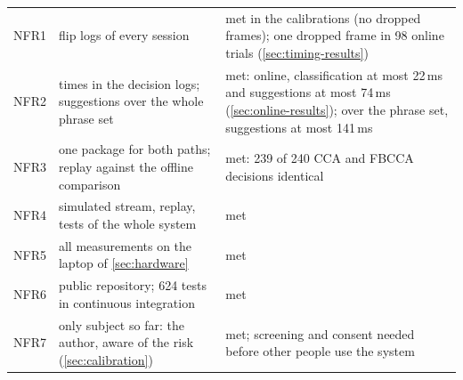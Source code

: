 \begin{table}[tb]
\begin{tabularx}{\textwidth}{@{}l>{\raggedright\arraybackslash}X>{\raggedright\arraybackslash}X@{}}
    \midrule
    NFR1 & flip logs of every session & met in the calibrations (no dropped frames); one dropped frame in 98 online trials (\cref{sec:timing-results}) \\
    NFR2 & times in the decision logs; suggestions over the whole phrase set & met: online, classification at most 22\,ms and suggestions at most 74\,ms (\cref{sec:online-results}); over the phrase set, suggestions at most 141\,ms \\
    NFR3 & one package for both paths; replay against the offline comparison & met: 239 of 240 \acs*{CCA} and \acs*{FBCCA} decisions identical \\
    NFR4 & simulated stream, replay, tests of the whole system & met \\
    NFR5 & all measurements on the laptop of \cref{sec:hardware} & met \\
    NFR6 & public repository; 624 tests in continuous integration & met \\
    NFR7 & only subject so far: the author, aware of the risk (\cref{sec:calibration}) & met; screening and consent needed before other people use the system \\
    \bottomrule
  \end{tabularx}
\end{table}
